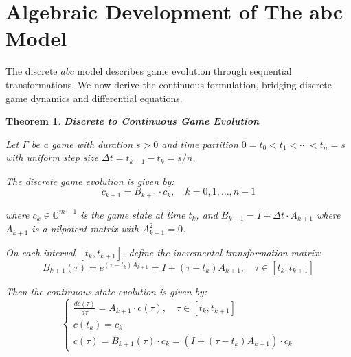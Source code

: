 \documentclass[11pt,a4paper]{article}
\theoremstyle{plain}
\newtheorem{theorem}{Theorem}[section]
\theoremstyle{definition}
\begin{document}
\vspace{0.5em}

\appendix

\section{Algebraic Development of The abc Model}
\label{app:algebraic-development}

\vspace{0.5em}

The discrete $abc$ model describes game evolution through sequential transformations. We now derive the continuous formulation, bridging discrete game dynamics and differential equations.

\vspace{0.5em}

\begin{theorem}\textbf{Discrete to Continuous Game Evolution}
\label{thm:game_evolution}

\vspace{0.5em}

Let $\Gamma$ be a game with duration $s > 0$ and time partition $0 = t_0 < t_1 < \cdots < t_n = s$ with uniform step size $\Delta t = t_{k+1} - t_k = s/n$.

\vspace{0.5em}

The discrete game evolution is given by:
\begin{equation}
c_{k+1} = B_{k+1} \cdot c_k, \quad k = 0, 1, \ldots, n-1
\label{eq:discrete_evolution}
\end{equation}

\vspace{0.5em}

where $c_k \in \mathbb{C}^{m+1}$ is the game state at time $t_k$, and $B_{k+1} = I + \Delta t \cdot A_{k+1}$ where $A_{k+1}$ is a nilpotent matrix with $A_{k+1}^2 = 0$.

\vspace{0.5em}

On each interval $[t_k, t_{k+1}]$, define the incremental transformation matrix:
\begin{equation}
B_{k+1}(\tau) = e^{(\tau - t_k) A_{k+1}} = I + (\tau - t_k) A_{k+1}, \quad \tau \in [t_k, t_{k+1}]
\label{eq:incremental_transformation}
\end{equation}

\vspace{0.5em}

Then the continuous state evolution is given by:
\begin{equation}
\boxed{
\begin{cases}
  \displaystyle\frac{dc(\tau)}{d\tau} = A_{k+1} \cdot c(\tau), \quad \tau \in [t_k, t_{k+1}] \\[0.5em]
  c(t_k) = c_k \\[0.5em]
  c(\tau) = B_{k+1}(\tau) \cdot c_k = (I + (\tau - t_k) A_{k+1}) \cdot c_k
\end{cases}
}
\label{eq:interval_evolution}
\end{equation}


\end{theorem}
\end{document}

